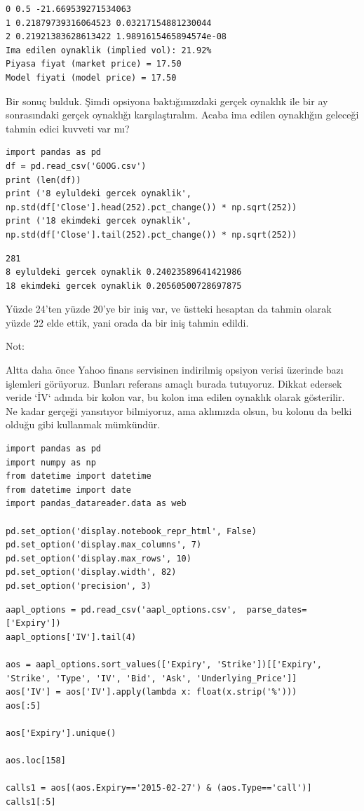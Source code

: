 \documentclass[12pt,fleqn]{article}\usepackage{../../common}
\begin{document}
\begin{verbatim}
0 0.5 -21.669539271534063
1 0.21879739316064523 0.03217154881230044
2 0.21921383628613422 1.9891615465894574e-08
Ima edilen oynaklik (implied vol): 21.92%
Piyasa fiyat (market price) = 17.50
Model fiyati (model price) = 17.50
\end{verbatim}

Bir sonuç bulduk. Şimdi opsiyona baktığımızdaki gerçek oynaklık ile bir ay
sonrasındaki gerçek oynaklığı karşılaştıralım. Acaba ima edilen oynaklığın
geleceği tahmin edici kuvveti var mı?

\begin{verbatim}
import pandas as pd
df = pd.read_csv('GOOG.csv')
print (len(df))
print ('8 eyluldeki gercek oynaklik', np.std(df['Close'].head(252).pct_change()) * np.sqrt(252))
print ('18 ekimdeki gercek oynaklik', np.std(df['Close'].tail(252).pct_change()) * np.sqrt(252))
\end{verbatim}

\begin{verbatim}
281
8 eyluldeki gercek oynaklik 0.24023589641421986
18 ekimdeki gercek oynaklik 0.20560500728697875
\end{verbatim}

Yüzde 24'ten yüzde 20'ye bir iniş var, ve üstteki hesaptan da tahmin olarak
yüzde 22 elde ettik, yani orada da bir iniş tahmin edildi. 

Not:

Altta daha önce Yahoo finans servisinen indirilmiş opsiyon verisi üzerinde bazı
işlemleri görüyoruz. Bunları referans amaçlı burada tutuyoruz. Dikkat edersek
veride `İV` adında bir kolon var, bu kolon ima edilen oynaklık olarak
gösterilir. Ne kadar gerçeği yansıtıyor bilmiyoruz, ama aklımızda olsun, bu
kolonu da belki olduğu gibi kullanmak mümkündür. 

\begin{verbatim}
import pandas as pd
import numpy as np
from datetime import datetime
from datetime import date
import pandas_datareader.data as web

pd.set_option('display.notebook_repr_html', False)
pd.set_option('display.max_columns', 7)
pd.set_option('display.max_rows', 10) 
pd.set_option('display.width', 82) 
pd.set_option('precision', 3)
\end{verbatim}

\begin{verbatim}
aapl_options = pd.read_csv('aapl_options.csv',  parse_dates=['Expiry'])
aapl_options['IV'].tail(4)

aos = aapl_options.sort_values(['Expiry', 'Strike'])[['Expiry', 'Strike', 'Type', 'IV', 'Bid', 'Ask', 'Underlying_Price']] 
aos['IV'] = aos['IV'].apply(lambda x: float(x.strip('%')))
aos[:5]

aos['Expiry'].unique()

aos.loc[158]

calls1 = aos[(aos.Expiry=='2015-02-27') & (aos.Type=='call')]
calls1[:5]
\end{verbatim}
\end{document}
